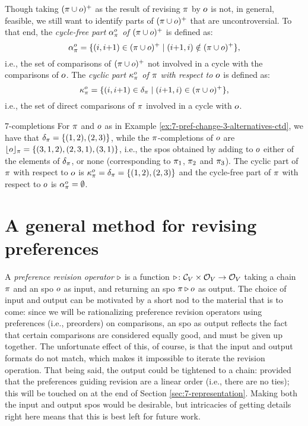 Though taking $(\pi\cup o)^+$ as the result of revising $\pi$ by $o$ is not, in general, feasible,
we still want to identify parts of $(\pi\cup o)^+$ that are uncontroversial.
To that end, the \emph{cycle-free part $\alpha_{\pi}^{o}$ of $(\pi\cup o)^+$} is defined as:
$$
\alpha_{\pi}^{o} = \{({i},{i}{+}{1})\in(\pi\cup o)^+\mid({i}{+}{1},i)\notin(\pi\cup o)^+\},
$$
i.e., the set of comparisons of $(\pi\cup o)^+$ not involved in a cycle with the comparisons of $o$.
The \emph{cyclic part $\kappa_{\pi}^{o}$ of $\pi$ with respect to $o$} is defined as:
$$
\kappa_{\pi}^{o} = \{({i},{i}{+}{1})\in\delta_\pi\mid({i}{+}{1},i)\in(\pi\cup o)^+\},
$$
i.e., the set of direct comparisons of $\pi$ involved in a cycle with $o$.

\begin{xmpl}{}{7-completions}
	For $\pi$ and $o$ as in Example \ref{ex:7-pref-change-3-alternatives-ctd}, 
	we have that $\delta_\pi=\{(1,2),(2,3)\}$,
	while the $\pi$-completions of $o$ are 
	$\lfloor{o}\rfloor_\pi=\{(3,1,2), (2,3,1), (3,1)\}$,
	i.e., the spos obtained by adding to $o$ either of the elements of $\delta_\pi$, or none
	(corresponding to $\pi_1$, $\pi_2$ and $\pi_3$).
	The cyclic part of $\pi$ with respect to $o$ is 
	$\kappa_{\pi}^{o}=\delta_\pi=\{(1,2),(2,3)\}$
	and
	the cycle-free part of $\pi$ with respect to $o$ is
	$\alpha_{\pi}^{o}=\emptyset$.
\end{xmpl}



















\section{A general method for revising preferences}\label{sec:7-semantics}
A \emph{preference revision operator $\triangleright$}
is a function
$\triangleright\colon\mathcal{C}_V\times\mathcal{O}_V\rightarrow\mathcal{O}_V$ 
taking a chain $\pi$ and an spo $o$ as input, 
and returning an spo $\pi\triangleright o$ as output.
The choice of input and output can be motivated by a short nod to the 
material that is to come: since we will be rationalizing 
preference revision operators using preferences (i.e., preorders) on comparisons,
an spo as output reflects the fact that certain comparisons are 
considered equally good, and must be given up together. 
The unfortunate effect of this, of course, is that the input and output formats do not match,
which makes it impossible to iterate the revision operation.
That being said, the output could be tightened to a chain: provided that the preferences 
guiding revision are a linear order (i.e., there are no ties); this will be touched on 
at the end of Section \ref{sec:7-representation}.
Making both the input and output spos would be desirable, 
but intricacies of getting details right here means that this is best left for future work.

